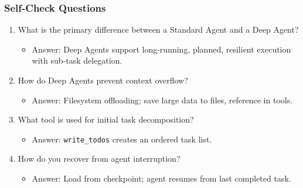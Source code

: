 \documentclass[aspectratio=169,11pt]{beamer}
\begin{document}
\begin{frame}[fragile]
\frametitle{Self-Check Questions}

\begin{enumerate}
    \setlength{\itemsep}{1pt}
  \item What is the primary difference between a Standard Agent and a Deep Agent?
  \begin{itemize}
    \setlength{\itemsep}{1pt}
    \small
    \item {\color{docgray}Answer: Deep Agents support long-running, planned, resilient execution with sub-task delegation.}
  \end{itemize}

  \vspace{0.5em}
  \item How do Deep Agents prevent context overflow?
  \begin{itemize}
    \setlength{\itemsep}{1pt}
    \small
    \item {\color{docgray}Answer: Filesystem offloading; save large data to files, reference in tools.}
  \end{itemize}

  \vspace{0.5em}
  \item What tool is used for initial task decomposition?
  \begin{itemize}
    \setlength{\itemsep}{1pt}
    \small
    \item {\color{docgray}Answer: \texttt{write\_todos} creates an ordered task list.}
  \end{itemize}

  \vspace{0.5em}
  \item How do you recover from agent interruption?
  \begin{itemize}
    \setlength{\itemsep}{1pt}
    \small
    \item {\color{docgray}Answer: Load from checkpoint; agent resumes from last completed task.}
  \end{itemize}
\end{enumerate}

\end{frame}
\end{document}
